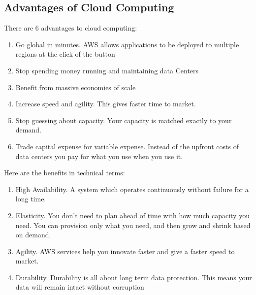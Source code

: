 \documentclass{article}%
\begin{document}
\subsection{Advantages of Cloud Computing}
There are 6 advantages to cloud computing: 
\begin{enumerate}
    \item Go global in minutes. AWS allows applications to be deployed to multiple regions at the click of the button
    \item Stop spending money running and maintaining data Centers
    \item Benefit from massive economies of scale
    \item Increase speed and agility. This gives faster time to market.
    \item Stop guessing about capacity. Your capacity is matched exactly to your demand.
    \item Trade capital expense for variable expense. Instead of the upfront costs of data centers you pay for what you use when you use it.
\end{enumerate}
Here are the benefits in technical terms:
\begin{enumerate}
    \item High Availability. A system which operates continuously without failure for a long time.
    \item Elasticity. You don't need to plan ahead of time with how much capacity you need. You can provision only what you need, and then grow and shrink based on demand.
    \item Agility. AWS services help you innovate faster and give a faster speed to market.
    \item Durability. Durability is all about long term data protection. This means your data will remain intact without corruption
\end{enumerate}
\end{document}
